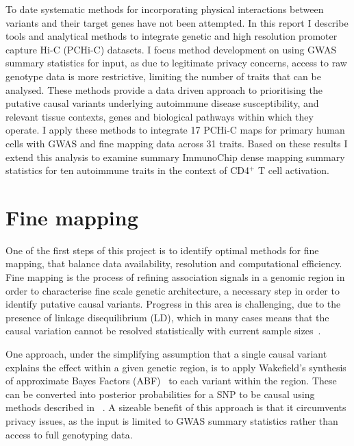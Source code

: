 \documentclass[a4paper,11pt]{report}
\begin{document}

To date systematic methods for incorporating physical interactions between variants and their target genes have not been attempted. In this report I describe tools and analytical methods to integrate genetic and high resolution promoter capture Hi-C (PCHi-C) datasets. I focus method development on using GWAS summary statistics for input, as due to legitimate privacy concerns, access to raw genotype data is more restrictive, limiting the number of traits that can be analysed. These methods provide a data driven approach to prioritising the putative causal variants underlying autoimmune disease susceptibility, and  relevant tissue contexts, genes and biological pathways within which they operate. I apply these methods to integrate 17 PCHi-C maps for primary human cells with GWAS and fine mapping data across 31 traits. Based on these results I extend this analysis to examine summary ImmunoChip dense mapping summary statistics for ten autoimmune traits in the context of CD4${^+}$ T cell activation.

\section{Fine mapping}
\label{sect:finemapping}
One of the first steps of this project is to identify optimal methods for fine mapping, that balance data availability, resolution and computational efficiency. Fine mapping is the process of refining association signals in a genomic region in order to characterise fine scale genetic architecture, a necessary step in order to identify putative causal variants. Progress in this area is challenging, due to the presence of linkage disequilibrium (LD), which in many cases means that the causal variation cannot be resolved statistically with current sample sizes~\citep{LiKellis2016}. 

 One approach, under the simplifying assumption that a single causal variant explains the effect within a given genetic region, is to apply Wakefield's synthesis of approximate Bayes Factors (ABF)~\citep{Wakefield2009} to each variant within the region. These can be converted into posterior probabilities for a SNP to be causal using methods described in ~\citet{The_Wellcome_Trust_Case_Control_Consortium2012-ad}. A sizeable benefit of this approach is that it circumvents privacy issues, as the input is limited to GWAS summary statistics rather than access to full genotyping data.
\end{document}
